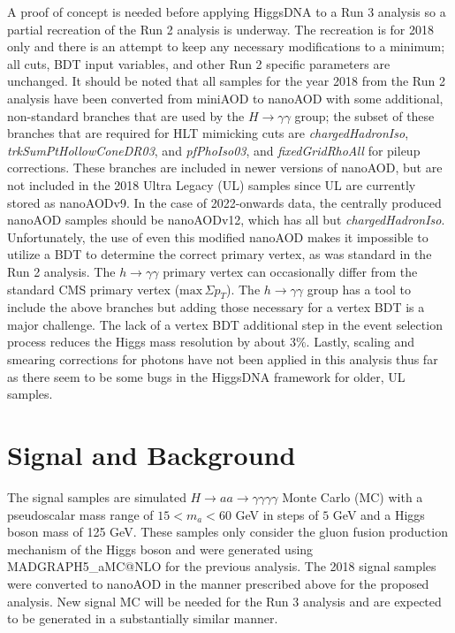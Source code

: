 \documentclass[12pt]{article}
\begin{document}
A proof of concept is needed before applying HiggsDNA to a Run 3 analysis so a partial recreation of the Run 2 analysis is underway. The recreation is for 2018 only and there is an attempt to keep any necessary modifications to a minimum; all cuts, BDT input variables, and other Run 2 specific parameters are unchanged. It should be noted that all samples for the year 2018 from the Run 2 analysis have been converted from miniAOD to nanoAOD with some additional, non-standard branches that are used by the $H \rightarrow \gamma\gamma$ group; the subset of these branches that are required for HLT mimicking cuts are \textit{chargedHadronIso}, \textit{trkSumPtHollowConeDR03}, and \textit{pfPhoIso03}, and \textit{fixedGridRhoAll} for pileup corrections. These branches are included in newer versions of nanoAOD, but are not included in the 2018 Ultra Legacy (UL) samples since UL are currently stored as nanoAODv9. In the case of 2022-onwards data, the centrally produced nanoAOD samples should be nanoAODv12, which has all but \textit{chargedHadronIso}. Unfortunately, the use of even this modified nanoAOD makes it impossible to utilize a BDT to determine the correct primary vertex, as was standard in the Run 2 analysis. The $h\rightarrow \gamma\gamma$ primary vertex can occasionally differ from the standard CMS primary vertex ($\mathrm{max}\,\Sigma p_T$). The $h\rightarrow \gamma\gamma$ group has a tool to include the above branches but adding those necessary for a vertex BDT is a major challenge. The lack of a vertex BDT additional step in the event selection process reduces the Higgs mass resolution by about $3\%$. Lastly, scaling and smearing corrections for photons have not been applied in this analysis thus far as there seem to be some bugs in the HiggsDNA framework for older, UL samples.\par

\section{Signal and Background}
The signal samples are simulated $H \rightarrow aa \rightarrow \gamma\gamma\gamma\gamma$ Monte Carlo (MC) with a pseudoscalar mass range of $15 < m_a < 60$ GeV in steps of $5$ GeV and a Higgs boson mass of 125 GeV. These samples only consider the gluon fusion production mechanism of the Higgs boson and were generated using MADGRAPH5\_aMC@NLO for the previous analysis. The 2018 signal samples were converted to nanoAOD in the manner prescribed above for the proposed analysis. New signal MC will be needed for the Run 3 analysis and are expected to be generated in a substantially similar manner.\par
\end{document}

